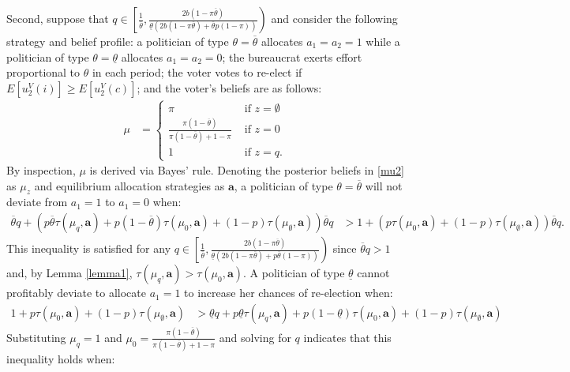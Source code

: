 \documentclass[11pt,english]{article}
\begin{document}
Second, suppose that $q \in \left[\frac{1}{\overline{\theta}}, \frac{2b (1 - \pi \overline{\theta})}{\underline{\theta}(2b(1-\pi \overline{\theta})+\overline{\theta}p(1-\pi))}\right)$ and consider the following strategy and belief profile: a politician of type $\theta = \overline{\theta}$ allocates $a_1 = a_2 = 1$ while a politician of type $\theta = \underline{\theta}$ allocates $a_1 = a_2 = 0$;  the bureaucrat exerts effort proportional to $\theta$ in each period; the voter votes to re-elect if $E[u_2^V(i)] \geq E[u_2^V(c)]$; and the voter's beliefs are as follows:
\begin{align}\label{mu2}
\mu & = \begin{cases}
\pi & \text{ if } z = \emptyset\\
\frac{\pi(1-\overline{\theta})}{\pi(1-\overline{\theta}) + 1-\pi} & \text{ if } z = 0\\
1 & \text{ if } z  = q. 
\end{cases}
\end{align}
 By inspection, $\mu$ is derived via Bayes' rule. Denoting the posterior beliefs in \eqref{mu2} as $\mu_z$ and equilibrium allocation strategies as $\boldsymbol{a}$, a politician of type $\theta = \overline{\theta}$ will not deviate from $a_1 = 1$ to $a_1 = 0$ when:
\begin{align*}
\overline{\theta}q + \left(p\overline{\theta}\tau(\mu_q, \boldsymbol{a}) + p(1-\overline{\theta})\tau(\mu_0, \boldsymbol{a}) + (1-p) \tau(\mu_\emptyset, \boldsymbol{a})\right)\overline{\theta}q& > 1 + \left(p\tau(\mu_0, \boldsymbol{a}) + (1-p) \tau(\mu_\emptyset, \boldsymbol{a})\right) \overline{\theta}q.
\end{align*}
\noindent This inequality is satisfied for any $q \in \left[\frac{1}{\overline{\theta}}, \frac{2b (1 - \pi \overline{\theta})}{\underline{\theta}(2b (1-\pi \overline{\theta}) + p\overline{\theta}(1 - \pi))}\right)$ since $\overline{\theta}q > 1$ and, by Lemma \ref{lemma1}, $\tau(\mu_q, \boldsymbol{a}) > \tau(\mu_0, \boldsymbol{a})$. A politician of type $\underline{\theta}$ cannot profitably deviate to allocate $a_1=1$ to increase her chances of re-election when:
\begin{align*}
1 + p\tau\left(\mu_0, \boldsymbol{a}\right) + (1-p) \tau(\mu_\emptyset, \boldsymbol{a})&> 
\underline{\theta}q + p\underline{\theta}\tau(\mu_q, \boldsymbol{a}) + p(1-\underline{\theta})\tau(\mu_0, \boldsymbol{a}) + (1-p)\tau(\mu_\emptyset, \boldsymbol{a})
\end{align*}
Substituting $\mu_q = 1$ and $\mu_0 = \frac{\pi(1-\overline{\theta})}{\pi(1-\overline{\theta}) + 1-\pi} $ and solving for $q$ indicates that this inequality holds when:
\end{document}
